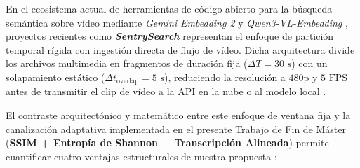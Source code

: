 En el ecosistema actual de herramientas de código abierto para la búsqueda semántica sobre vídeo mediante \textit{Gemini Embedding 2} y \textit{Qwen3-VL-Embedding} \cite{gemini_emb2_docs, qwen3_vl_emb2026}, proyectos recientes como \textbf{\textit{SentrySearch}} \cite{sentrysearch2026} representan el enfoque de partición temporal rígida con ingestión directa de flujo de vídeo. %
Dicha arquitectura divide los archivos multimedia en fragmentos de duración fija ($\Delta T = 30\text{ s}$) con un solapamiento estático ($\Delta t_{\text{overlap}} = 5\text{ s}$), reduciendo la resolución a $480\text{p}$ y $5\text{ FPS}$ antes de transmitir el clip de vídeo a la API en la nube o al modelo local \cite{sentrysearch2026}. %

El contraste arquitectónico y matemático entre este enfoque de ventana fija y la canalización adaptativa implementada en el presente Trabajo de Fin de Máster (\textbf{SSIM + Entropía de Shannon + Transcripción Alineada}) permite cuantificar cuatro ventajas estructurales de nuestra propuesta \cite{video_rac2025, sentrysearch2026}: %

